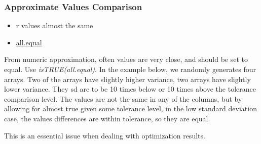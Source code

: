 \documentclass[
]{book}
\providecommand{\tightlist}{%
  \setlength{\itemsep}{0pt}\setlength{\parskip}{0pt}}
\begin{document}
\hypertarget{approximate-values-comparison}{%
\subsubsection{Approximate Values Comparison}\label{approximate-values-comparison}}

\begin{itemize}
\tightlist
\item
  r values almost the same
\item
  \href{https://stat.ethz.ch/R-manual/R-patched/library/base/html/all.equal.html}{all.equal}
\end{itemize}

From numeric approximation, often values are very close, and should be set to equal. Use \emph{isTRUE(all.equal)}. In the example below, we randomly generates four arrays. Two of the arrays have slightly higher variance, two arrays have slightly lower variance. They sd are to be 10 times below or 10 times above the tolerance comparison level. The values are not the same in any of the columns, but by allowing for almost true given some tolerance level, in the low standard deviation case, the values differences are within tolerance, so they are equal.

This is an essential issue when dealing with optimization results.
\end{document}
